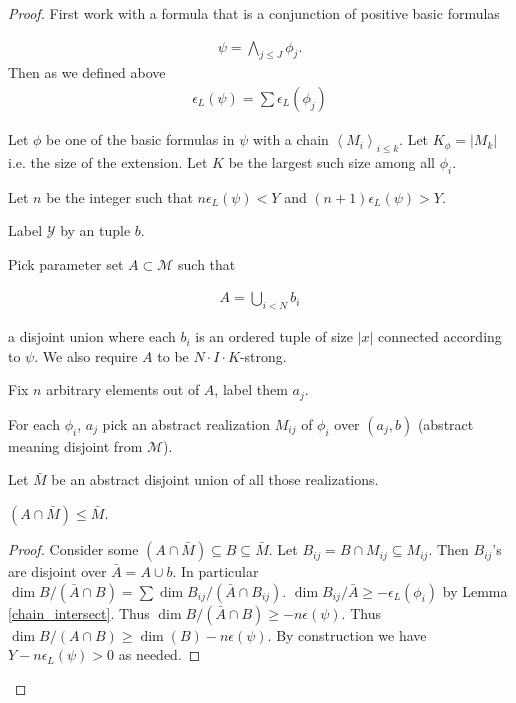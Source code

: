 \documentclass{amsart}
\newcommand{\MM}{\mathscr M}
\newcommand{\Y}{\mathcal Y}
\newcommand{\agl}[1]{\left\langle #1 \right\rangle}
\begin{document}
\begin{proof}
  First work with a formula that is a conjunction of positive basic formulas

  \begin{align*}
    \psi = \bigwedge_{j \leq J} \phi_j.
  \end{align*}
  Then as we defined above
  \begin{align*}
    \epsilon_L(\psi) = \sum \epsilon_L(\phi_j)
  \end{align*}
  
  Let $\phi$ be one of the basic formulas in $\psi$ with a chain $\agl{M_i}_{i \leq k}$.
  Let $K_\phi = |M_k|$ i.e. the size of the extension.
  Let $K$ be the largest such size among all $\phi_i$.

  Let $n$ be the integer such that $n \epsilon_L(\psi) < Y$ and $(n+1) \epsilon_L(\psi) > Y$.

  Label $\Y$ by an tuple $b$.

  Pick parameter set $A \subset \MM$ such that 

  \begin{align*}
    A = \bigcup_{i<N} b_i
  \end{align*}

  a disjoint union where each $b_i$ is an ordered tuple of size $|x|$ connected according to $\psi$.
  We also require $A$ to be $N \cdot I \cdot K$-strong.

  Fix $n$ arbitrary elements out of $A$, label them $a_j$.

  For each $\phi_i$, $a_j$ pick an abstract realization $M_{ij}$ of $\phi_i$ over $(a_j, b)$
  (abstract meaning disjoint from $\MM$).
  
  Let $\bar M$ be an abstract disjoint union of all those realizations.

  \begin{Claim}
    $(A \cap \bar M) \leq \bar M$.
  \end{Claim}
  \begin{proof}
    Consider some $(A \cap \bar M) \subseteq B \subseteq \bar M$.
    Let $B_{ij} = B \cap M_{ij} \subseteq M_{ij}$.
    Then $B_{ij}$'s are disjoint over $\bar A = A \cup b$.
    In particular $\dim B / (\bar A \cap B) = \sum \dim B_{ij} / (\bar A \cap B_{ij})$.
    $\dim B_{ij} / \bar A \geq -\epsilon_L(\phi_i)$ by Lemma \ref{chain_intersect}.
    Thus $\dim B / (\bar A \cap B) \geq -n\epsilon(\psi)$.
    Thus $\dim B / (A \cap B) \geq \dim(B) - n\epsilon(\psi)$.
    By construction we have $Y - n\epsilon_L(\psi) > 0$ as needed.
  \end{proof}


\end{proof}
\end{document}
